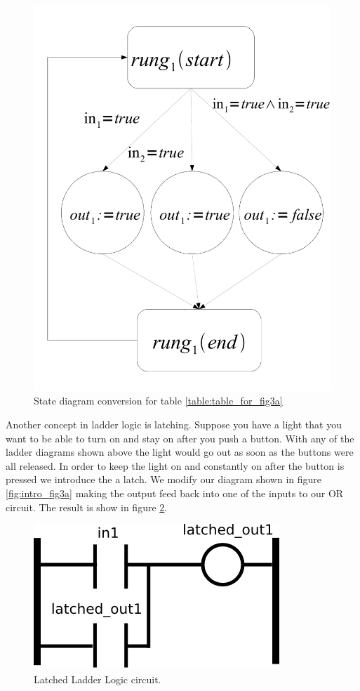 \begin{figure}[h]
    \centering
    \includegraphics[width=\imgmedsmall]{./images/intro_or_graph_3a.pdf} %
    \caption{State diagram conversion for table \ref{table:table_for_fig3a}}
    \label{fig:intro_or_graph_3a}
\end{figure}

Another concept in ladder logic is latching. Suppose you have a light that you want to be able to turn on and stay on after you push a button. With any of the ladder diagrams shown above the light would go out as soon as the buttons were all released. In order to keep the light on and constantly on after the button is pressed we introduce the a latch. We modify our diagram shown in figure \ref{fig:intro_fig3a} making the output feed back into one of the inputs to our OR circuit. The result is show in figure \ref{fig:intro_fig_latched}.

\begin{figure}[h]
    \centering
    \includegraphics[width=\imgsmall]{./images/intro_fig_latched.png} 
    \caption{Latched Ladder Logic circuit.}
    \label{fig:intro_fig_latched}
\end{figure}

